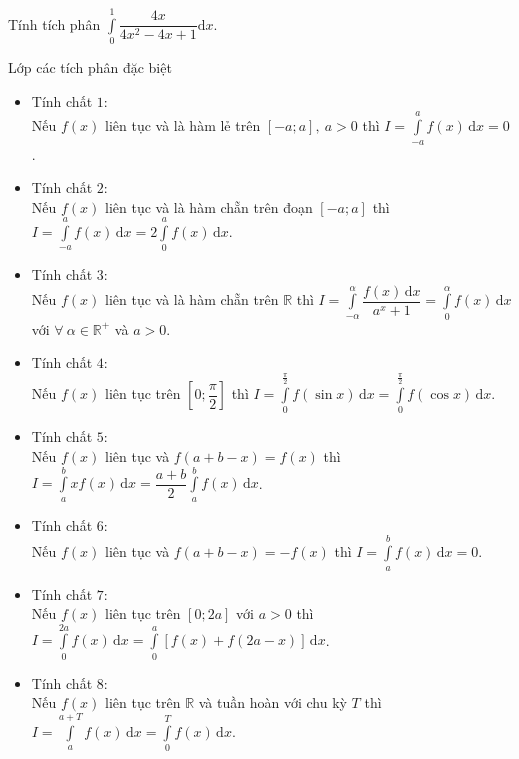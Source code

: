 \begin{bt}%
	Tính tích phân $\displaystyle\int\limits_{0}^{1}\dfrac{4x}{4x^2-4x+1}\textrm{d}x$.
\end{bt}
\begin{dang}{Lớp các tích phân đặc biệt}
	\begin{itemize}
		\item Tính chất $1$:\\ Nếu $f(x)$ liên tục và là hàm lẻ trên $\left[-a;a\right],\ a>0$ thì $I=\displaystyle\int\limits_{-a}^{a}f(x)\mathrm{\,d}x=0$.
		\item Tính chất $2$:\\ Nếu $f(x)$ liên tục và là hàm chẵn trên đoạn $\left[-a;a\right]$ thì $I=\displaystyle\int\limits_{-a}^{a}f(x)\mathrm{\,d}x=2\displaystyle\int\limits_{0}^{a}f(x)\mathrm{\,d}x$.
		\item Tính chất $3$:\\ Nếu $f(x)$ liên tục và là hàm chẵn trên $\mathbb{R}$ thì $I=\displaystyle\int\limits_{-\alpha}^{\alpha}\dfrac{f(x)\mathrm{\,d}x}{a^x+1} =\displaystyle\int\limits_{0}^{\alpha}f(x)\mathrm{\,d}x$ với $\forall\ \alpha \in\mathbb{R}^+$ và $a>0$.
		\item Tính chất $4$:\\ Nếu $f(x)$ liên tục trên $\left[0;\dfrac{\pi}{2}\right]$ thì $I=\displaystyle\int\limits_{0}^{\frac{\pi}{2}}f(\sin x)\mathrm{\,d}x=\displaystyle\int\limits_{0}^{\frac{\pi}{2}}f(\cos x)\mathrm{\,d}x$.
		\item Tính chất $5$:\\ Nếu $f(x)$ liên tục và $f\left(a+b-x\right)=f(x)$ thì $I=\displaystyle\int\limits_{a}^{b}xf(x)\mathrm{\,d}x=\dfrac{a+b}{2}\displaystyle\int\limits_{a}^{b}f(x)\mathrm{\,d}x$.
		\item Tính chất $6$:\\ Nếu $f(x)$ liên tục và $f\left(a+b-x\right)=-f(x)$ thì $I=\displaystyle\int\limits_{a}^{b}f(x)\mathrm{\,d}x=0$.
		\item Tính chất $7$:\\ Nếu $f(x)$ liên tục trên $\left[0;2a\right]$ với $a>0$ thì $I=\displaystyle\int\limits_{0}^{2a}f(x)\mathrm{\,d}x=\displaystyle\int\limits_{0}^{a}\left[f(x)+f\left(2a-x\right)\right]\mathrm{\,d}x$.
		\item Tính chất $8$:\\ Nếu $f(x)$ liên tục trên $\mathbb{R}$ và tuần hoàn với chu kỳ $T$ thì $I=\displaystyle\int\limits_{a}^{a+T}f(x)\mathrm{\,d}x=\displaystyle\int\limits_{0}^{T}f(x)\mathrm{\,d}x$.
	\end{itemize}
\end{dang}
